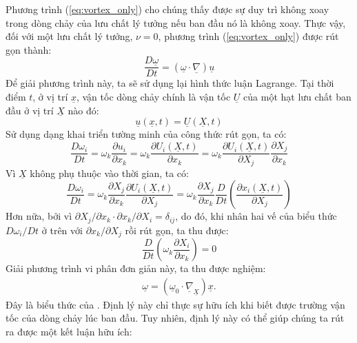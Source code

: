 \documentclass[CO_LUU_CHAT.tex]{subfiles}
\begin{document}
	Phương trình (\ref{eq:vortex_only}) cho chúng thấy được sự duy trì không xoay trong dòng chảy của lưu chất lý tưởng nếu ban đầu nó là không xoay. Thực vậy, đối với một lưu chất lý tưởng, $\nu = 0$, phương trình (\ref{eq:vortex_only}) được rút gọn thành:
		\[
			\frac{{D\underline\omega}}{{Dt}}= \left(\underline\omega\cdot\underline {\nabla}\right)\underline u
		\]
	Để giải phương trình này, ta sẽ sử dụng lại hình thức luận Lagrange. Tại thời điểm $t$, ở vị trí $\underline x$, vận tốc dòng chảy chính là vận tốc $\underline U$ của một hạt lưu chất ban đầu ở vị trí $\underline X$ nào đó:
		\[
			\underline u(\underline x,t)=\underline U(\underline X,t)
		\]
	Sử dụng dạng khai triển tường minh của công thức rút gọn, ta có:
		\[
			\frac{{D\omega_i}}{{Dt}}=\omega_k\dfrac{\partial u_i}{\partial x_k}=\omega_k\dfrac{\partial U_i(\underline X,t)}{\partial x_k}=\omega_k\dfrac{\partial U_i(\underline X,t)}{\partial X_j}\dfrac{\partial X_j}{\partial x_k}
		\]
	Vì $\underline X$ không phụ thuộc vào thời gian, ta có:
		\[
			\frac{{D\omega_i}}{{Dt}}=\omega_k\dfrac{\partial X_j}{\partial x_k}\dfrac{\partial U_i(\underline X,t)}{\partial X_j}=\omega_k\dfrac{\partial X_j}{\partial x_k}\dfrac{D}{Dt}\left(\dfrac{\partial x_i(\underline X,t)}{\partial X_j}\right)
		\]
	Hơn nữa, bởi vì ${\partial X_j}/{\partial x_k}\cdot{\partial x_k}/{\partial X_i}=\delta_{ij}$, do đó, khi nhân hai vế của biểu thức ${D\omega_i}/{{Dt}}$ ở trên với ${\partial x_k}/{\partial X_j}$ rồi rút gọn, ta thu được:
		\[
			\dfrac{D}{Dt}\left(\omega_k\dfrac{\partial X_i}{\partial x_k}\right)=0
		\]
	Giải phương trình vi phân đơn giản này, ta thu được nghiệm:
	\begin{align}
		\boxed{
			\underline\omega=\left(\underline\omega_0\cdot\underline\nabla_{\underline X}\right)\underline x
		}.
	\end{align}
	Đây là biểu thức của . Định lý này chỉ thực sự hữu ích khi biết được trường vận tốc của dòng chảy lúc ban đầu. Tuy nhiên, định lý này có thể giúp chúng ta rút ra được một kết luận hữu ích:\\
	
		\leftskip=1cm
		\rightskip=1cm
		
		
		\leftskip=0cm
		\rightskip=0cm
	
\end{document}
